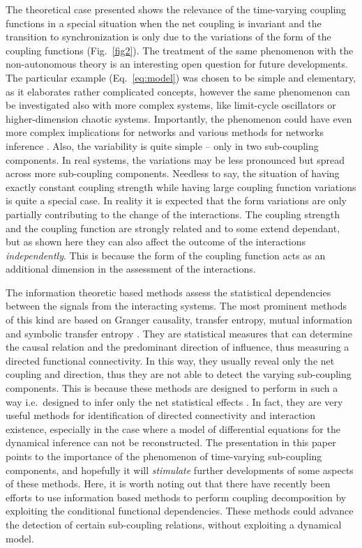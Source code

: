 \documentclass[pre,aps,twocolumn,showpacs]{revtex4}
\begin{document}
The theoretical case presented shows the relevance of the time-varying coupling functions in a special situation when the net coupling is invariant and the transition to synchronization is only due to the variations of the form of the coupling functions (Fig.\ \ref{fig2}). The treatment of the same phenomenon with the non-autonomous theory is an interesting open question for future developments. The particular example (Eq.\ \ref{eq:model}) was chosen to be simple and elementary, as it elaborates rather complicated concepts, however the same phenomenon can be investigated also with more complex systems, like limit-cycle oscillators or higher-dimension chaotic systems. Importantly, the phenomenon could have even more complex implications for networks \cite{Barabasi:02} and various methods for networks inference \cite{Timme:07,Levnajic:10,Sysoev:14,Levnaji:14,Timme:14}. Also, the variability is quite simple -- only in two sub-coupling components.  In real systems, the variations may be less pronounced but spread across more sub-coupling components. Needless to say, the situation of having exactly constant coupling strength while having large coupling function variations is quite a special case. In reality it is expected  that the form variations are only partially contributing to the change of the interactions. The coupling strength and the coupling function are strongly related and to some extend dependant, but as shown here they can also affect the outcome of the interactions \emph{independently}. This is because the form of the coupling function acts as an additional dimension in the assessment of the interactions.

The information theoretic based methods assess the statistical dependencies between the signals from the interacting systems. The most prominent methods of this kind are based on Granger causality, transfer entropy,  mutual information and symbolic transfer entropy \cite{Granger:69,Barrett:13,Schreiber:00a,Palus:03a,Staniek:08}. They are statistical measures that can determine the causal relation and the predominant direction of influence, thus measuring a directed functional connectivity. In this way, they usually reveal only the net coupling and direction, thus they are not able to detect the varying sub-coupling components. This is because these methods are designed to perform in such a way i.e.\  designed to infer only the net statistical effects \cite{Barrett:13}. In fact, they are very useful methods for identification of directed connectivity and interaction existence, especially in the case where a model of differential equations for the dynamical inference can not be reconstructed. The presentation in this paper points to the importance of the phenomenon of time-varying sub-coupling components, and hopefully it will \emph{stimulate} further developments of some aspects of these methods. Here, it is worth noting out that there have recently been efforts to use information based methods to perform coupling decomposition \cite{Faes:15,Porta:15} by exploiting the conditional functional dependencies. These methods could advance the detection of certain sub-coupling relations, without exploiting a dynamical model.
\end{document}
